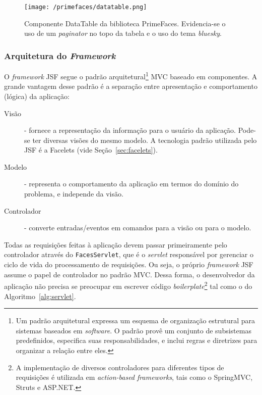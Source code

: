\documentclass[
  10.5pt,				  %
	openright,			%
	twoside,			  %
  a5paper,
  chapter=TITLE,	%
	section=TITLE,	%
  hyphens,        %
	english,        %
	brazil          %
]{abntex2}
\begin{document}
\begin{figure}[!ht]
  \caption{\label{fig:primefaces_datatable}Componente DataTable da biblioteca PrimeFaces. Evidencia-se o uso de um \emph{paginator} no topo da tabela e o uso do tema \emph{bluesky}.}
  \begin{center}
    \texttt{[image: /primefaces/datatable.png]}
  \end{center}
\end{figure}

 
\subsubsection{Arquitetura do \emph{Framework}}

O \emph{framework} JSF segue o padrão arquitetural\footnote{Um padrão arquitetural expressa um esquema de organização estrutural para sistemas baseados em \emph{software}. O padrão provê um conjunto de subsistemas predefinidos, especifica suas responsabilidades, e inclui regras e diretrizes para organizar a relação entre eles.\cite{buschmann96}} MVC baseado em componentes. A grande vantagem desse padrão é a separação entre apresentação e comportamento (lógica) da aplicação:

\begin{description}
  \item[Visão] - fornece a representação da informação para o usuário da aplicação. Pode-se ter diversas visões do mesmo modelo. A tecnologia padrão utilizada pelo JSF é a Facelets (vide Seção~\ref{sec:facelets}).
  \item[Modelo] - representa o comportamento da aplicação em termos do domínio do problema, e independe da visão.
  \item[Controlador] - converte entradas/eventos em comandos para a visão ou para o modelo.
\end{description}

Todas as requisições feitas à aplicação devem passar primeiramente pelo controlador através do \texttt{FacesServlet}, que é o \emph{servlet} responsável por gerenciar o ciclo de vida do processamento de requisições. Ou seja, o próprio \emph{framework} JSF assume o papel de controlador no padrão MVC. Dessa forma, o desenvolvedor da aplicação não precisa se preocupar em escrever código \emph{boilerplate}\footnote{A implementação de diversos controladores para diferentes tipos de requisições é utilizada em \emph{action-based frameworks}, tais como o SpringMVC, Struts e ASP.NET.} tal como o do Algoritmo~\ref{alg:servlet}.
\end{document}
